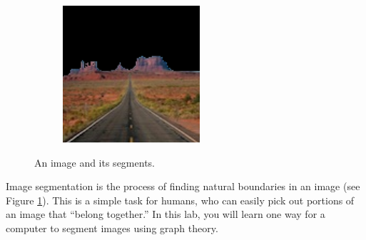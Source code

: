 \begin{figure}
\begin{subfigure}{0.31\textwidth}
    \end{subfigure}
    \hspace*{\fill}
    \begin{subfigure}{0.31\textwidth}
        \includegraphics[width=\textwidth]{figures/PosMon.pdf}
    \end{subfigure}

\caption{An image and its segments.}
\label{fig:monument}
\end{figure}
Image segmentation is the process of finding natural boundaries in an image (see Figure \ref{fig:monument}).
This is a simple task for humans, who can easily pick out portions of an image that ``belong together.''
In this lab, you will learn one way for a computer to segment images using graph theory.


